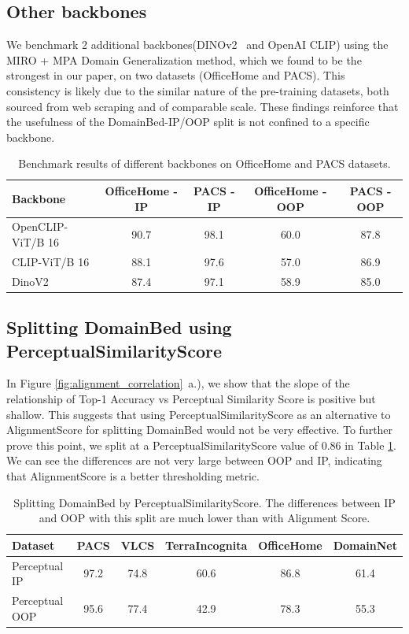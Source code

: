 \documentclass{article} %
\begin{document}
\subsection{Other backbones}

We benchmark 2 additional backbones(DINOv2~\citep{oquab2023dinov2} and OpenAI CLIP) using the MIRO + MPA Domain Generalization method, which we found to be the strongest in our paper, on two datasets (OfficeHome and PACS). This consistency is likely due to the similar nature of the pre-training datasets, both sourced from web scraping and of comparable scale. These findings reinforce that the usefulness of the DomainBed-IP/OOP split is not confined to a specific backbone.

\begin{table}[h!]
\centering
\caption{Benchmark results of different backbones on OfficeHome and PACS datasets.}
\begin{tabular}{lcccc}
\hline
\textbf{Backbone} & \textbf{OfficeHome - IP} & \textbf{PACS - IP} & \textbf{OfficeHome - OOP} & \textbf{PACS - OOP} \\
\hline
OpenCLIP-ViT/B 16 & 90.7 & 98.1 & 60.0 & 87.8 \\
CLIP-ViT/B 16 & 88.1 & 97.6 & 57.0 & 86.9 \\
DinoV2 & 87.4 & 97.1 & 58.9 & 85.0 \\
\hline
\end{tabular}
\end{table}

\subsection{Splitting DomainBed using PerceptualSimilarityScore}

\label{sec:perceptual_comparison}

In Figure \ref{fig:alignment_correlation}~a.), we show that the slope of the relationship of Top-1 Accuracy vs Perceptual Similarity Score is positive but shallow. This suggests that using PerceptualSimilarityScore as an alternative to AlignmentScore for splitting DomainBed would not be very effective.  To further prove this point, we split at a PerceptualSimilarityScore value of 0.86 in Table \ref{tab:perceptual_split}. We can see the differences are not very large between OOP and IP, indicating that AlignmentScore is a better thresholding metric. 

\begin{table}[]
\centering
\caption{Splitting DomainBed by PerceptualSimilarityScore. The differences between IP and OOP with this split are much lower than with Alignment Score.}
\begin{tabular}{lccccc}
\hline
  \textbf{Dataset}  & PACS & VLCS & TerraIncognita & OfficeHome & DomainNet \\ \hline
Perceptual IP  & 97.2 & 74.8 & 60.6           & 86.8       & 61.4      \\ \hline
Perceptual OOP & 95.6 & 77.4 & 42.9           & 78.3       & 55.3      \\ \hline
\end{tabular}
\color{black}
\label{tab:perceptual_split}
\end{table}
\end{document}
